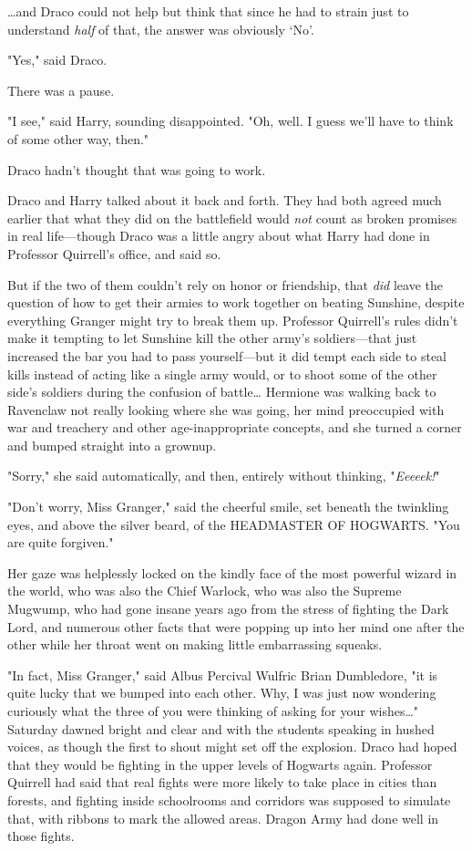 {\ldots}and Draco could not help but think that since he had to strain just to
understand \emph{half} of that, the answer was obviously `No'.

"Yes," said Draco.

There was a pause.

"I see," said Harry, sounding disappointed. "Oh, well. I guess we'll have to
think of some other way, then."

Draco hadn't thought that was going to work.

Draco and Harry talked about it back and forth. They had both agreed much
earlier that what they did on the battlefield would \emph{not} count as broken
promises in real life---though Draco was a little angry about what Harry had
done in Professor Quirrell's office, and said so.

But if the two of them couldn't rely on honor or friendship, that \emph{did}
leave the question of how to get their armies to work together on beating
Sunshine, despite everything Granger might try to break them up. Professor
Quirrell's rules didn't make it tempting to let Sunshine kill the other army's
soldiers---that just increased the bar you had to pass yourself---but it did
tempt each side to steal kills instead of acting like a single army would, or
to shoot some of the other side's soldiers during the confusion of
battle{\ldots}
\later
Hermione was walking back to Ravenclaw not really looking where she was going,
her mind preoccupied with war and treachery and other age-inappropriate
concepts, and she turned a corner and bumped straight into a grownup.

"Sorry," she said automatically, and then, entirely without thinking,
"\emph{Eeeeek!}"

"Don't worry, Miss Granger," said the cheerful smile, set beneath the twinkling
eyes, and above the silver beard, of the HEADMASTER OF HOGWARTS. "You are quite
forgiven."

Her gaze was helplessly locked on the kindly face of the most powerful wizard
in the world, who was also the Chief Warlock, who was also the Supreme Mugwump,
who had gone insane years ago from the stress of fighting the Dark Lord, and
numerous other facts that were popping up into her mind one after the other
while her throat went on making little embarrassing squeaks.

"In fact, Miss Granger," said Albus Percival Wulfric Brian Dumbledore, "it is
quite lucky that we bumped into each other. Why, I was just now wondering
curiously what the three of you were thinking of asking for your wishes{\ldots}"
\later
Saturday dawned bright and clear and with the students speaking in hushed
voices, as though the first to shout might set off the explosion.
\later
Draco had hoped that they would be fighting in the upper levels of Hogwarts
again. Professor Quirrell had said that real fights were more likely to take
place in cities than forests, and fighting inside schoolrooms and corridors was
supposed to simulate that, with ribbons to mark the allowed areas. Dragon Army
had done well in those fights.


